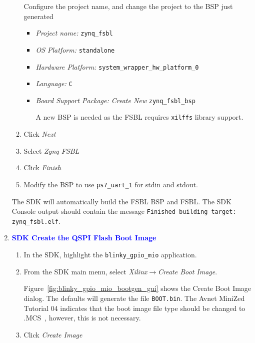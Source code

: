 \begin{enumerate}
\begin{enumerate}
Configure the project name, and change the project to the BSP just generated
\begin{itemize}
\item \emph{Project name:} \texttt{zynq\_fsbl}
\item \emph{OS Platform:} \texttt{standalone}
\item \emph{Hardware Platform:} \texttt{system\_wrapper\_hw\_platform\_0}
\item \emph{Language:} \texttt{C}
\item \emph{Board Support Package: Create New} \texttt{zynq\_fsbl\_bsp}

A new BSP is needed as the FSBL requires \verb+xilffs+ library support.
\end{itemize}
\item Click \emph{Next}
\item Select \emph{Zynq FSBL}

\item Click \emph{Finish}

\item Modify the BSP to use \verb+ps7_uart_1+ for stdin and stdout.

\end{enumerate}

The SDK will automatically build the FSBL BSP and FSBL. The SDK Console
output should contain the message \verb+Finished building target: zynq_fsbl.elf+.

\item \textcolor{blue}{\textbf{SDK Create the QSPI Flash Boot Image}}
%
\begin{enumerate}
\item In the SDK, highlight the \verb+blinky_gpio_mio+ application.
\item From the SDK main menu, select \emph{Xilinx}$\rightarrow$\emph{Create Boot Image}.

Figure~\ref{fig:blinky_gpio_mio_bootgen_gui} shows the Create Boot Image dialog.
The defaults will generate the file \verb+BOOT.bin+. The Avnet MiniZed Tutorial 04
indicates that the boot image file type should be changed to
.MCS~\cite{Avnet_MiniZed_Tutorial04_2018}, however, this is not necessary.

\item Click \emph{Create Image}
\end{enumerate}


\end{enumerate}
